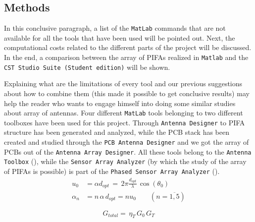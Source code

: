 \documentclass[10pt,a4paper,twocolumn]{article}
\begin{document}
{\subsection*{\selectfont\color{Turquoise}Methods}
In this conclusive paragraph, a list of the \texttt{\color{BurntOrange}MatLab} commands that are not available for all the tools that have been used will be pointed out. Next, the computational costs related to the different parts of the project will be discussed. In the end, a comparison between the array of PIFAs realized in \texttt{\color{BurntOrange}Matlab} and the \texttt{\color{Periwinkle}CST Studio Suite (Student edition)} will be shown. 

\indent Explaining what are the limitations of every tool and our previous suggestions about how to combine them (this made it possible to get conclusive results) may help the reader who wants to engage himself into doing some similar studies about array of antennas. Four different \texttt{\color{BurntOrange}MatLab} tools belonging to two different toolboxes have been used for this project. Through \texttt{\color{Mahogany}Antenna Designer} to PIFA structure has been generated and analyzed, while the PCB stack has been created and studied through the \texttt{\color{Mahogany}PCB Antenna Designer} and we got the array of PCBs out of the \texttt{\color{Mahogany}Antenna Array Designer}. All these tools belong to the \texttt{\color{ForestGreen}Antenna Toolbox} (\textbf{\cite{AntennaToolbox}}), while the \texttt{\color{Mahogany}Sensor Array Analyzer} (by which the study of the array of PIFAs is possible) is part of the \texttt{\color{ForestGreen}Phased Sensor Array Analyzer} (\textbf{\cite{PhasedArraySystemToolbox}}). 
\begin{equation}
	\begin{aligned}
		u_0&=\alpha d_{opt}\,=\,2\pi\frac{d_{opt}}{\lambda}\,\cos(\theta_0)\\
		\alpha_n&=n\,\alpha\,d_{opt}=nu_0\qquad \left(n=\overline{1,5}\right)
		\label{eq:phase coefficients}
	\end{aligned}
\end{equation}

\begin{equation}
	G_{total}=\,\eta_T\,G_0\,G_T
	\label{eq:pattern multiplication}
\end{equation}









}
\end{document}
